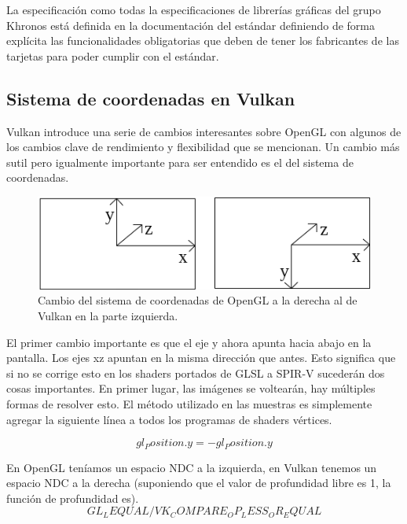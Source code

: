 \documentclass[a4paper, 17pt]{book}
\begin{document}
La especificación como todas la especificaciones de librerías gráficas del grupo Khronos está definida en la documentación
del estándar definiendo de forma explícita las funcionalidades obligatorias que deben de tener los fabricantes de las tarjetas
para poder cumplir con el estándar.


\subsection{Sistema de coordenadas en Vulkan} 
\label{subsec:SysVulkan}

Vulkan introduce una serie de cambios interesantes sobre OpenGL con algunos de los cambios clave de rendimiento y flexibilidad
que se mencionan. Un cambio más sutil pero igualmente importante para ser entendido es el del sistema de coordenadas.

\begin{figure}[H]
    \centering
    \includegraphics[scale=0.75, keepaspectratio]{img/coordinateDiagram.png}
    \caption{Cambio del sistema de coordenadas de OpenGL a la derecha al de Vulkan en la parte izquierda.}
    \label{figura:khronos}
\end{figure}

El primer cambio importante es que el eje y ahora apunta hacia abajo en la pantalla. Los ejes xz apuntan en la misma
dirección que antes. Esto significa que si no se corrige esto en los shaders portados de GLSL a SPIR-V sucederán dos
cosas importantes. En primer lugar, las imágenes se voltearán, hay múltiples formas de resolver esto. El método
utilizado en las muestras es simplemente agregar la siguiente línea a todos los programas de shaders vértices.

\begin{equation}
gl_Position.y = -gl_Position.y
\end{equation}

En OpenGL teníamos un espacio NDC a la izquierda, en Vulkan tenemos un espacio NDC a la derecha (suponiendo que el valor
de profundidad libre es 1, la función de profundidad es). \begin{equation} GL_LEQUAL / VK_COMPARE_OP_LESS_OR_EQUAL \end{equation}
\end{document}
